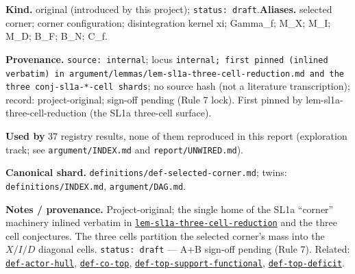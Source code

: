 \begin{defnote}
\textbf{Kind.} original (introduced by this project); \texttt{status: draft}.\quad\textbf{Aliases.} selected corner; corner configuration; disintegration kernel xi; Gamma\_f; M\_X; M\_I; M\_D; B\_F; B\_N; C\_f.
\par
\textbf{Provenance.} \texttt{source: internal}; locus \texttt{internal;\allowbreak{} first pinned (inlined verbatim) in argument/\allowbreak{}lemmas/\allowbreak{}lem-\allowbreak{}sl1a-\allowbreak{}three-\allowbreak{}cell-\allowbreak{}reduction.\allowbreak{}md and the three conj-\allowbreak{}sl1a-\allowbreak{}*-\allowbreak{}cell shards}; no source hash (not a literature transcription); record: project-\allowbreak{}original;\allowbreak{} sign-\allowbreak{}off pending (Rule 7 lock).\allowbreak{} First pinned by lem-\allowbreak{}sl1a-\allowbreak{}three-\allowbreak{}cell-\allowbreak{}reduction (the SL1a three-\allowbreak{}cell surface).
\par
\textbf{Used by} 37 registry results, none of them reproduced in this report (exploration track; see \texttt{argument/INDEX.md} and \texttt{report/UNWIRED.md}).
\par
\textbf{Canonical shard.} \texttt{definitions/\allowbreak{}def-\allowbreak{}selected-\allowbreak{}corner.\allowbreak{}md}; twins: \texttt{definitions/INDEX.md}, \texttt{argument/DAG.md}.
\par
\textbf{Notes / provenance.} Project-original; the single home of the SL1a ``corner'' machinery inlined
verbatim in \hyperlink{dag:lem-sl1a-three-cell-reduction}{\texttt{lem-\allowbreak{}sl1a-\allowbreak{}three-\allowbreak{}cell-\allowbreak{}reduction}} and the three cell conjectures. The three cells partition
the selected corner's mass into the $X/I/D$ diagonal cells. \texttt{status:\allowbreak{} draft} --- A+B sign-off pending
(Rule 7). Related: \hyperref[def:actor-hull]{\texttt{def-\allowbreak{}actor-\allowbreak{}hull}}, \hyperref[def:co-top]{\texttt{def-\allowbreak{}co-\allowbreak{}top}}, \hyperref[def:top-support-functional]{\texttt{def-\allowbreak{}top-\allowbreak{}support-\allowbreak{}functional}}, \hyperref[def:top-deficit]{\texttt{def-\allowbreak{}top-\allowbreak{}deficit}}.
\end{defnote}

